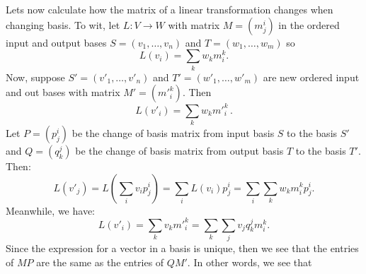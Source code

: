 Lets now calculate how the matrix of a linear transformation changes when changing basis.
To wit, let $L \colon V \longrightarrow W$ with matrix $M=(m^i_j)$ in the ordered input and output bases $S=(v_1, \ldots, v_n )$ and $T=(w_1,\ldots,w_m)$ so
\[
L(v_i) = \sum_k w_km^k_i.
\]
Now, suppose $S'=(v'_1, \ldots, v'_n )$ and $T'=(w'_1,\ldots,w'_m)$ are new  ordered input and out bases with matrix $M'=({m'}_i^k)$. Then
\[
L(v'_i)= \sum_k w_km'^k_i\, .
\]
Let $P=(p^i_j)$ be the change of basis matrix from input basis $S$ to the basis $S'$ and $Q=(q^j_k)$ be the change of basis matrix from output basis $T$ to the basis $T'$.  Then:
\[
L(v'_j)=L\left(\sum_i v_i p^i_j\right) = \sum_i L(v_i)p^i_j
= \sum_i \sum_k w_k m^k_i p^i_j.
\]
Meanwhile, we have:
\[
L(v'_i) = \sum_kv_km'^k_i = \sum_k \sum_j v_j q^j_km^k_i.
\]
Since the expression for a vector in a basis is unique, then we see that the entries of $MP$ are the same as the entries of $QM'$.  In other words, we see that

